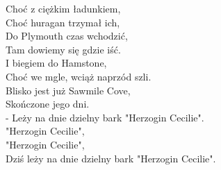 \newpage
Choć z ciężkim ładunkiem, \\
Choć huragan trzymał ich, \\
Do Plymouth czas wchodzić, \\
Tam dowiemy się gdzie iść. \\

I biegiem do Hamstone, \\
Choć we mgle, wciąż naprzód szli. \\
Blisko jest już Sawmile Cove, \\
Skończone jego dni. \\
- Leży na dnie dzielny bark "Herzogin Cecilie". \\
"Herzogin Cecilie", \\
"Herzogin Cecilie", \\
Dziś leży na dnie dzielny bark "Herzogin Cecilie". \\
